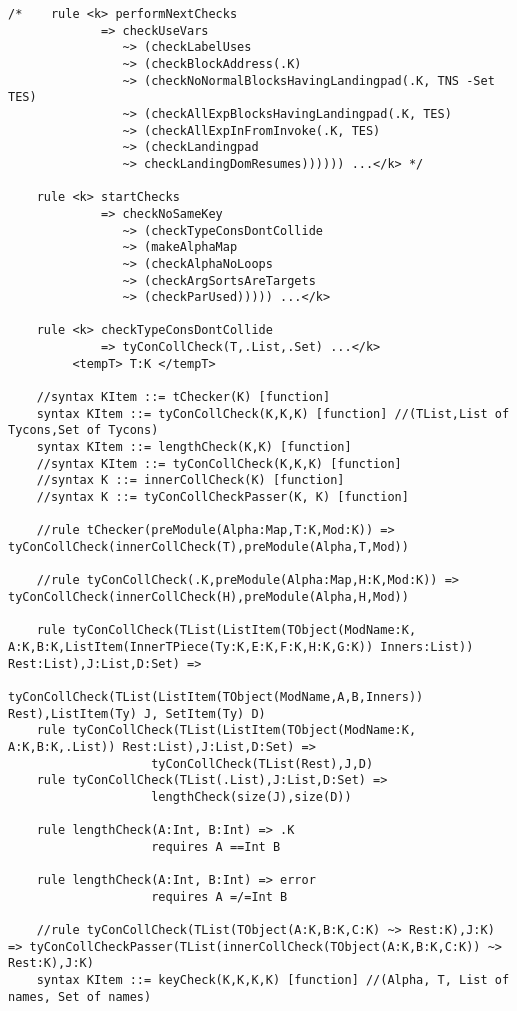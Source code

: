 \begin{lstlisting}
/*    rule <k> performNextChecks
             => checkUseVars
                ~> (checkLabelUses
                ~> (checkBlockAddress(.K)
                ~> (checkNoNormalBlocksHavingLandingpad(.K, TNS -Set TES)
                ~> (checkAllExpBlocksHavingLandingpad(.K, TES)
                ~> (checkAllExpInFromInvoke(.K, TES)
                ~> (checkLandingpad
                ~> checkLandingDomResumes)))))) ...</k> */

    rule <k> startChecks
             => checkNoSameKey
                ~> (checkTypeConsDontCollide
                ~> (makeAlphaMap
                ~> (checkAlphaNoLoops
                ~> (checkArgSortsAreTargets
                ~> (checkParUsed))))) ...</k>

    rule <k> checkTypeConsDontCollide
             => tyConCollCheck(T,.List,.Set) ...</k>
         <tempT> T:K </tempT>

    //syntax KItem ::= tChecker(K) [function]
    syntax KItem ::= tyConCollCheck(K,K,K) [function] //(TList,List of Tycons,Set of Tycons) 
    syntax KItem ::= lengthCheck(K,K) [function]
    //syntax KItem ::= tyConCollCheck(K,K,K) [function]
    //syntax K ::= innerCollCheck(K) [function]
    //syntax K ::= tyConCollCheckPasser(K, K) [function]

    //rule tChecker(preModule(Alpha:Map,T:K,Mod:K)) => tyConCollCheck(innerCollCheck(T),preModule(Alpha,T,Mod))

    //rule tyConCollCheck(.K,preModule(Alpha:Map,H:K,Mod:K)) => tyConCollCheck(innerCollCheck(H),preModule(Alpha,H,Mod))

    rule tyConCollCheck(TList(ListItem(TObject(ModName:K, A:K,B:K,ListItem(InnerTPiece(Ty:K,E:K,F:K,H:K,G:K)) Inners:List)) Rest:List),J:List,D:Set) => 
                    tyConCollCheck(TList(ListItem(TObject(ModName,A,B,Inners)) Rest),ListItem(Ty) J, SetItem(Ty) D)
    rule tyConCollCheck(TList(ListItem(TObject(ModName:K, A:K,B:K,.List)) Rest:List),J:List,D:Set) => 
                    tyConCollCheck(TList(Rest),J,D)
    rule tyConCollCheck(TList(.List),J:List,D:Set) => 
                    lengthCheck(size(J),size(D))

    rule lengthCheck(A:Int, B:Int) => .K
                    requires A ==Int B

    rule lengthCheck(A:Int, B:Int) => error
                    requires A =/=Int B

    //rule tyConCollCheck(TList(TObject(A:K,B:K,C:K) ~> Rest:K),J:K) => tyConCollCheckPasser(TList(innerCollCheck(TObject(A:K,B:K,C:K)) ~> Rest:K),J:K)
    syntax KItem ::= keyCheck(K,K,K,K) [function] //(Alpha, T, List of names, Set of names)


\end{lstlisting}
